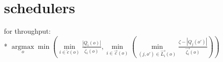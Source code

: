 \section{schedulers}\label{sec:schedulers}
for throughput:\\*
$
\underset{o}{\operatorname{argmax}}
	\min(	
		\underset{i \in \overleftarrow{c}(o)} {\min}
			\frac {\left| Q_i (o) \right|} {\overleftarrow{\zeta_i}(o)},
		\underset{i \in \overrightarrow{c}(o)} {\min}	
			( \underset{(j, o') \in \overrightarrow{L_i}(o)} {\min} 
				\frac {\zeta - \left| Q_j (o') \right|} {\overrightarrow{\zeta_i}(o)}
			)
		)
$
